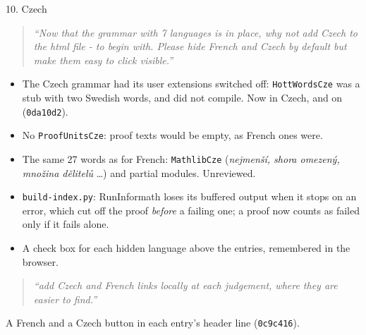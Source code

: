 \documentclass[10pt,aspectratio=169]{beamer}
\newcommand{\bad}[1]{\textcolor{warn}{#1}}
\newcommand{\commit}[1]{\texttt{\footnotesize #1}}
\newcommand{\prompt}[1]{\begin{quote}\small\itshape ``#1''\end{quote}}
\begin{document}
\begin{frame}{10. Czech}
  \prompt{Now that the grammar with 7 languages is in place, why not add Czech to the
  html file - to begin with. Please hide French and Czech by default but make them
  easy to click visible.}
  \begin{itemize}
    \item The Czech grammar had its user extensions switched off: \texttt{HottWordsCze}
          was a stub with two \bad{Swedish} words, and did not compile. Now in Czech,
          and on (\commit{0da10d2}).
    \item No \texttt{ProofUnitsCze}: proof texts would be empty, as French ones were.
    \item The same 27 words as for French: \texttt{MathlibCze} (\emph{nejmenší, shora
          omezený, množina dělitelů} \dots) and partial modules. Unreviewed.
    \item \texttt{build-index.py}: RunInformath loses its buffered output when it stops
          on an error, which cut off the proof \emph{before} a failing one; a proof now
          counts as failed only if it fails alone.
    \item A check box for each hidden language above the entries, remembered in the
          browser.
  \end{itemize}
  \prompt{add Czech and French links locally at each judgement, where they are easier
  to find.}
  A French and a Czech button in each entry's header line (\commit{0c9c416}).
\end{frame}
\end{document}
